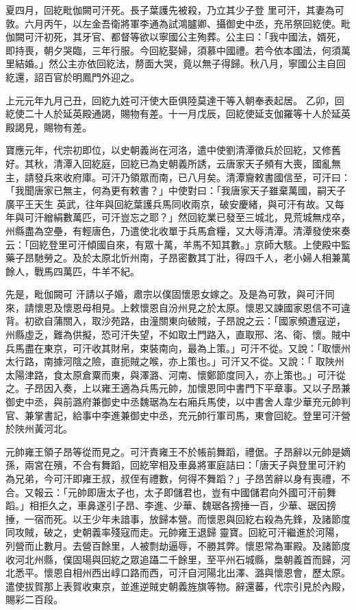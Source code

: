 \begin{pinyinscope}
 夏四月，回紇毗伽闕可汗死。長子葉護先被殺，乃立其少子登
 里可汗，其妻為可敦。六月丙午，以左金吾衛將軍李通為試鴻臚卿、攝御史中丞，充吊祭回紇使。毗伽闕可汗初死，其牙官、都督等欲以寧國公主殉葬。公主曰：「我中國法，婿死，即持喪，朝夕哭臨，三年行服。今回紇娶婦，須慕中國禮。若今依本國法，何須萬里結婚。」然公主亦依回紇法，剺面大哭，竟以無子得歸。秋八月，寧國公主自回紇還，詔百官於明鳳門外迎之。



 上元元年九月己丑，回紇九姓可汗使大臣俱陸莫達干等入朝奉表起居。
 乙卯，回紇使二十人於延英殿通謁，賜物有差。十一月戊辰，回紇使延支伽羅等十人於延英殿謁見，賜物有差。



 寶應元年，代宗初即位，以史朝義尚在河洛，遣中使劉清潭徵兵於回紇，又修舊好。其秋，清潭入回紇庭，回紇已為史朝義所誘，云唐家天子頻有大喪，國亂無主，請發兵來收府庫。可汗乃領眾而南，已八月矣。清潭齎敕書國信至，可汗曰：「我聞唐家已無主，何為更有敕書？」中使對曰：「我唐家天子雖棄萬國，嗣天子廣平王天生
 英武，往年與回紇葉護兵馬同收兩京，破安慶緒，與可汗有故。又每年與可汗繒絹數萬匹，可汗豈忘之耶？」然回紇業已發至三城北，見荒城無戍卒，州縣盡為空壘，有輕唐色，乃遣使北收單于兵馬倉糧，又大辱清潭。清潭發使來奏云：「回紇登里可汗傾國自來，有眾十萬，羊馬不知其數。」京師大駭。上使殿中監藥子昂馳勞之。及於太原北忻州南，子昂密數其丁壯，得四千人，老小婦人相兼萬餘人，戰馬四萬匹，牛羊不紀。



 先是，毗伽闕可
 汗請以子婚，肅宗以僕固懷恩女嫁之。及是為可敦，與可汗同來，請懷恩及懷恩母相見。上敕懷恩自汾州見之於太原。懷恩又諫國家恩信不可違背。初欲自蒲關入，取沙苑路，由潼關東向破賊，子昂說之云：「國家頻遭寇逆，州縣虛乏，難為供擬，恐可汗失望，不如取土門路入，直取邢、洺、衛、懷。賊中兵馬盡在東京，可汗收其財帛，束裝南向，最為上策。」可汗不從。又說：「取懷州太行路，南據河陰之險，直扼賊之喉，亦上策也。」可汗又不從。又說：「
 取陜州太陽津路，食太原倉粟而東，與澤潞、河南、懷鄭節度同入，亦上策也。」可汗從之。子昂因入奏，上以雍王適為兵馬元帥，加懷恩同中書門下平章事。又以子昂兼御史中丞，與前潞府兼御史中丞魏琚為左右廂兵馬使，以中書舍人韋少華充元帥判官、兼掌書記，給事中李進兼御史中丞，充元帥行軍司馬，東會回紇。登里可汗營於陜州黃河北。



 元帥雍王領子昂等從而見之。可汗責雍王不於帳前舞蹈，禮倨。子昂辭以元帥是嫡
 孫，兩宮在殯，不合有舞蹈，回紇宰相及車鼻將軍庭詰曰：「唐天子與登里可汗約為兄弟，今可汗即雍王叔，叔侄有禮數，何得不舞蹈？」子昂苦辭以身有喪禮，不合。又報云：「元帥即唐太子也，太子即儲君也，豈有中國儲君向外國可汗前舞蹈。」相拒久之，車鼻遂引子昂、李進、少華、魏琚各搒捶一百，少華、琚因搒捶，一宿而死。以王少年未諳事，放歸本營。而懷恩與回紇右殺為先鋒，及諸節度同攻賊，破之，史朝義率殘寇而走。元帥雍王退歸
 靈寶。回紇可汗繼進於河陽，列營而止數月。去營百餘里，人被剽劫逼辱，不勝其弊。懷恩常為軍殿。及諸節度收河北州縣，僕固瑒與回紇之眾追躡二千餘里，至平州石城縣，梟朝義首而歸，河北悉平。懷恩自相州西出崞口路而西，可汗自河陽北出澤、潞與懷恩會，歷太原。遣使拔賀那上表賀收東京，並進逆賊史朝義旌旗等物。辭還蕃，代宗引見於內殿，賜彩二百段。




\end{pinyinscope}

